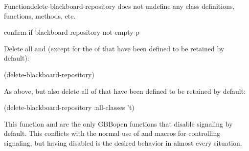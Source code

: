 \documentclass[10pt,twoside,english,pdftex]{article}
\begin{document}
\begin{functiondoc}{Function}{delete-blackboard-repository}
 does not undefine any class
definitions, functions, methods, etc.

\begin{alsos}{confirm-if-blackboard-repository-not-empty-p}
\end{alsos}

\fnexamples 

Delete all  and 
(except for the  of  that have been
defined to be retained by default):
%
\W\supp
\begin{example}
  (delete-blackboard-repository)
\end{example}
%
As above, but also delete all  of 
that have been defined to be retained by default:
%
\W\supp\notpretop
\begin{example}
  (delete-blackboard-repository :all-classes 't)
\end{example}

\fnnote 
%
%
%
%
This function and  are the only GBBopen
functions that disable  signaling by default.  This conflicts
with the normal use of  and
 macros for controlling
 signaling, but having  disabled is the desired
behavior in almost every  situation.

\end{functiondoc}

\end{document}

